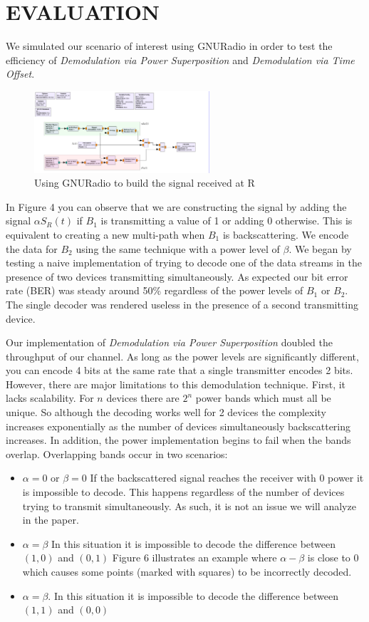 \documentclass[letterpaper, 10 pt, conference]{IEEEconf}
\begin{document}
 
\section{EVALUATION}

We simulated our scenario of interest using GNURadio in order to test the efficiency of \textit{Demodulation via Power Superposition} and \textit{Demodulation via Time Offset}. 
\begin{figure}[h!]
  \centerline{\includegraphics[width=65mm,scale=0.50]{Figure_5(simple).png}}
  \caption{Using GNURadio to build the signal received at R}
\end{figure}

In Figure 4 you can observe that we are constructing the signal by adding the signal $\alpha S_{R}(t)$ if $B_1$ is transmitting a value of 1 or adding 0 otherwise. This is equivalent to creating a new multi-path when $B_1$ is backscattering. We encode the  data for $B_2$ using the same technique with a power level of $\beta$. We began by testing a naive implementation of trying to decode one of the data streams in the presence of two devices transmitting simultaneously. As expected our bit error rate (BER) was steady around 50\% regardless of the power levels of $B_1$ or $B_2$. The single decoder was rendered useless in the presence of a second transmitting device. 

Our implementation of \textit{Demodulation via Power Superposition} doubled the throughput of our channel. As long as the power levels are significantly different, you can encode 4 bits at the same rate that a single transmitter encodes 2 bits. However, there are major limitations to this demodulation technique. First, it lacks scalability. For $n$ devices there are $2^n$ power bands which must all be unique. So although the decoding works well for 2 devices the complexity increases exponentially as the number of devices simultaneously backscattering increases. In addition, the power implementation begins to fail when the bands overlap. Overlapping bands occur in two scenarios:

\begin{itemize}
\item $\alpha = 0$ or $\beta = 0$ If the backscattered signal reaches the receiver with 0 power it is impossible to decode. This happens regardless of the number of devices trying to transmit simultaneously. As such, it is not an issue we will analyze in the paper. 
\item $\alpha = \beta$ In this situation it is impossible to decode the difference between $(1, 0)$ and $(0, 1)$ Figure 6 illustrates an example where $\alpha - \beta$ is close to 0 which causes some points (marked with squares) to be incorrectly decoded. 
\item $\alpha = \beta$. In this situation it is impossible to decode the difference between $(1, 1)$ and $(0, 0)$ \end{itemize}
\end{document}
